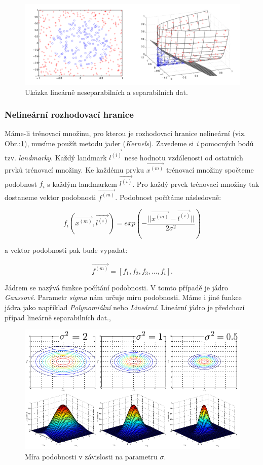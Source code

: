 \documentclass[a4]{article}
\begin{document}
\begin{figure}[!ht]
	\centering
		\includegraphics[width=\textwidth]{images/linear_nonlinear}
	\caption{Ukázka lineárně neseparabilních a separabilních dat.\cite{svm_wiki}}
	\label{fig:linear_nonlinear}
\end{figure}

\subsubsection{Nelineární rozhodovací hranice}
Máme-li trénovací množinu, pro kterou je rozhodovací hranice nelineární (viz. Obr.:\ref{fig:linear_nonlinear}), musíme použít metodu jader (\textit{Kernels}). Zavedeme si \textit{i} pomocných bodů tzv. \textit{landmarky}. Každý landmark $\vec{l^{(i)}}$ nese hodnotu vzdálenosti od ostatních prvků trénovací množiny. Ke každému prvku $\vec{x^{(m)}}$ trénovací množiny spočteme podobnost $f_{i}$ s každým landmarkem $\vec{l^{(i)}}$. Pro každý prvek trénovací množiny tak dostaneme vektor podobnosti $\vec{f^{(m)}}$. Podobnost počítáme následovně:

$$f_{i}(\vec{x^{(m)}},\vec{l^{(i)}}) = exp(-\frac{||\vec{x^{(m)}} - \vec{l^{(i)}}||}{2\sigma^2})$$

\noindent a vektor podobnosti pak bude vypadat:

$$\vec{f^{(m)}} = [f_{1},f_{2},f_{3},...,f_{i}].$$

\noindent Jádrem se nazývá funkce počítání podobnosti. V tomto případě je jádro \textit{Gaussové}. Parametr \textit{sigma} nám určuje míru podobnosti. Máme i jiné funkce jádra jako například \textit{Polynomiální} nebo \textit{Lineární}. Lineární jádro je předchozí případ lineárně separabilních dat.\cite{svm_robots},\cite{svm_wiki}

\begin{figure}[!ht]
	\centering
		\includegraphics[width=\textwidth]{images/sigma}
	\caption{Míra podobnosti v závislosti na parametru $\sigma$.\cite{svm_zcu}}
	\label{fig:sigma}
\end{figure}
\end{document}
